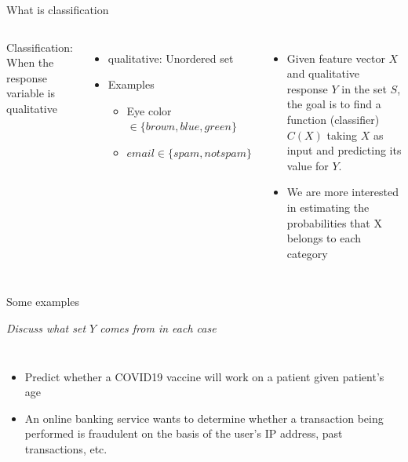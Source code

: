 \documentclass[aspectratio=169,usenames,dvipsnames]{beamer}
\newcommand{\InstructorNotes}[1]{\textit{\color{orange}#1}}
\newcommand{\InstructorList}[1]{
\begin{itemize}
	\color{orange}
	#1
\end{itemize}
}
\begin{document}
\begin{frame}[t]{What is classification }

\begin{columns}
Classification: When the response variable is qualitative

\InstructorList{
\item qualitative: Unordered set
\item Examples
\InstructorList{
\item Eye color $\in \{ brown, blue, green\}$
\item $email \in \{ spam, not spam\}$
}
}
\begin{itemize}
	\item
Given feature vector $X$ and qualitative response $Y$ in the set $S$, the goal is to find a function (classifier) $C(X)$ taking $X$ as input and predicting its value for $Y$.

	\item
We are more interested in estimating the probabilities that X belongs to each category
\end{itemize}
\end{columns}

\end{frame}
\begin{frame}[c]{Some examples }

\InstructorNotes{Discuss what set $Y$ comes from in each case }

\begin{columns}
\centering
\begin{itemize}
	\item Predict whether a COVID19 vaccine will work on a patient given patient's age
	\item An online banking service wants to determine whether a transaction being performed is fraudulent on the basis of the user's IP address, past transactions, etc.

\end{itemize}
\centering

\end{columns}

\end{frame}

\end{document}
